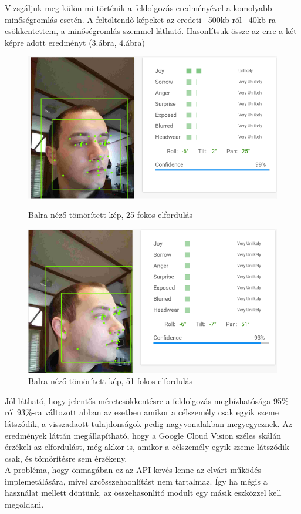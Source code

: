 Vizsgáljuk meg külön mi történik a feldolgozás eredményével a komolyabb minőségromlás esetén. A feltöltendő képeket az eredeti ~500kb-ról ~40kb-ra csökkentettem, a minőségromlás szemmel látható. Hasonlítsuk össze az erre a két képre adott eredményt (3.ábra, 4.ábra)
\begin{figure}[h]
 \begin{minipage}{.5\textwidth} 
    \includegraphics[scale=0.3]{img/cloud_vision_left_compressed}
    \caption{Balra néző tömörített kép, 25 fokos elfordulás}
 \end{minipage}
 \begin{minipage}{.5\textwidth} 
     \includegraphics[scale=0.3]{img/cloud_vision_very_left_compressed}
     \caption{Balra néző tömörített kép, 51 fokos elfordulás}
 \end{minipage}
\end{figure}

Jól látható, hogy jelentős méretcsökkentésre a feldolgozás megbízhatósága 95\%-ról 93\%-ra változott abban az esetben amikor a célszemély csak egyik szeme látszódik, a visszadaott tulajdonságok pedig nagyvonalakban megyegyeznek. 
Az eredmények láttán megállapítható, hogy a Google Cloud Vision széles skálán érzékeli az elfordulást, még akkor is, amikor a célszemély egyik szeme látszódik csak, és tömörítésre sem érzékeny.
\\A probléma, hogy önmagában ez az API kevés lenne az elvárt működés implemetálására, mivel arcösszehaonlítást nem tartalmaz. Így ha mégis a használat mellett döntünk, az összehasonlító modult egy másik eszközzel kell megoldani.

